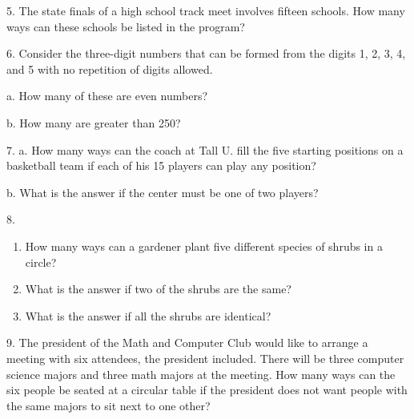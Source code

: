\documentclass[10pt,]{book}
\theoremstyle{plain}
\theoremstyle{definition}
\begin{document}
\begin{exercisegroup}
%
\par\smallskip
\item[5.]\hypertarget{exercise-66}{} The state finals of a high school track meet involves fifteen schools. How many ways can these schools be listed in the program?\par\smallskip
\item[6.]\hypertarget{exercise-67}{} Consider the three-digit numbers that can be formed from the digits 1, 2, 3, 4, and 5 with no repetition of digits allowed.%
\par
a. How many of these are even numbers?%
\par
b. How many are greater than 250?%
\par\smallskip
\item[7.]\hypertarget{exercise-68}{}a. How many ways can the coach at Tall U. fill the five starting positions on a basketball team if each of his 15 players can play any position?%
\par
b. What is the answer if the center must be one of two players?%
\par\smallskip
\item[8.]\hypertarget{exercise-69}{}\leavevmode%
\begin{enumerate}[label=(\alph*)]
\item\hypertarget{li-214}{}How many ways can a gardener plant five different species of shrubs in a circle?\item\hypertarget{li-215}{}What is the answer if two of the shrubs are the same?\item\hypertarget{li-216}{}What is the answer if all the shrubs are identical?\end{enumerate}
\par\smallskip
\item[9.]\hypertarget{exercise-70}{} The president of the Math and Computer Club would like to arrange a meeting with six attendees, the president included. There will be three computer science majors and three math majors at the meeting. How many ways can the six people be seated at a circular table if the president does not want people with the same majors to sit next to one other?\par\smallskip
\end{exercisegroup}
\par\smallskip\noindent
\end{document}
